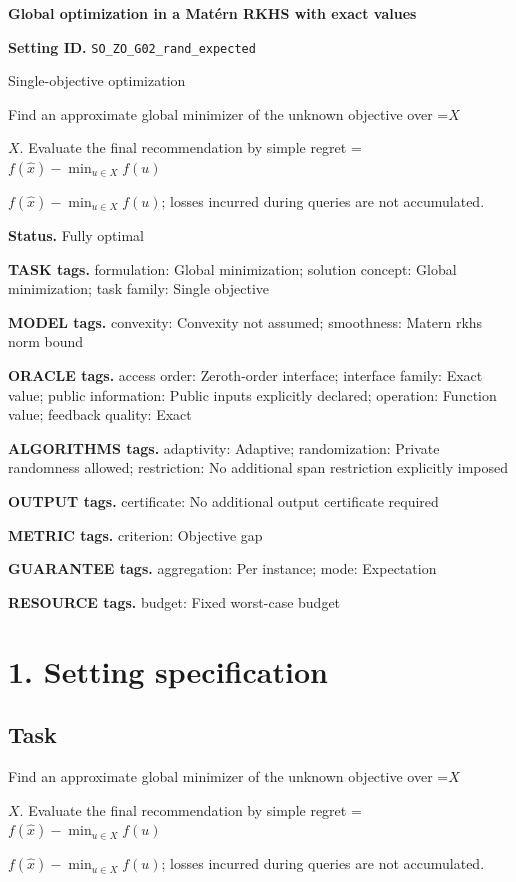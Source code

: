 \documentclass[10pt,a4paper]{article}
\newcommand{\AtlasMath}[1]{\par\begingroup\centering\setbox0=\hbox{$\displaystyle #1$}\ifdim\wd0>1.4\linewidth\typeout{ATLAS WIDE FORMULA: \the\wd0}\fi\ifdim\wd0>\linewidth\resizebox{\linewidth}{!}{\box0}\else\box0\fi\par\endgroup}
\newcommand{\AtlasInlineMath}[1]{\begingroup\setbox0=\hbox{$#1$}\ifdim\wd0>.4\linewidth\endgroup\AtlasMath{#1}\else\endgroup$#1$\fi}
\begin{document}
\raggedright

{\LARGE\bfseries\sffamily\color{AtlasNavy} Global optimization in a Matérn RKHS with exact values\par}\vspace{5pt}
\textbf{Setting ID.} \texttt{SO\_\allowbreak{}\allowbreak{}ZO\_\allowbreak{}\allowbreak{}G02\_\allowbreak{}\allowbreak{}rand\_\allowbreak{}\allowbreak{}expected}

Single-objective optimization

Find an approximate global minimizer of the unknown objective over \AtlasInlineMath{X}. Evaluate the final recommendation by simple regret \AtlasInlineMath{f(\widehat{x})-\min_{u\in X}f(u)}; losses incurred during queries are not accumulated.

\textbf{Status.} Fully optimal

\textbf{TASK tags.} formulation: Global minimization; solution concept: Global minimization; task family: Single objective

\textbf{MODEL tags.} convexity: Convexity not assumed; smoothness: Matern rkhs norm bound

\textbf{ORACLE tags.} access order: Zeroth-order interface; interface family: Exact value; public information: Public inputs explicitly declared; operation: Function value; feedback quality: Exact

\textbf{ALGORITHMS tags.} adaptivity: Adaptive; randomization: Private randomness allowed; restriction: No additional span restriction explicitly imposed

\textbf{OUTPUT tags.} certificate: No additional output certificate required

\textbf{METRIC tags.} criterion: Objective gap

\textbf{GUARANTEE tags.} aggregation: Per instance; mode: Expectation

\textbf{RESOURCE tags.} budget: Fixed worst-case budget

\section{1. Setting specification}
\subsection{Task}
Find an approximate global minimizer of the unknown objective over \AtlasInlineMath{X}. Evaluate the final recommendation by simple regret \AtlasInlineMath{f(\widehat{x})-\min_{u\in X}f(u)}; losses incurred during queries are not accumulated.
\end{document}
